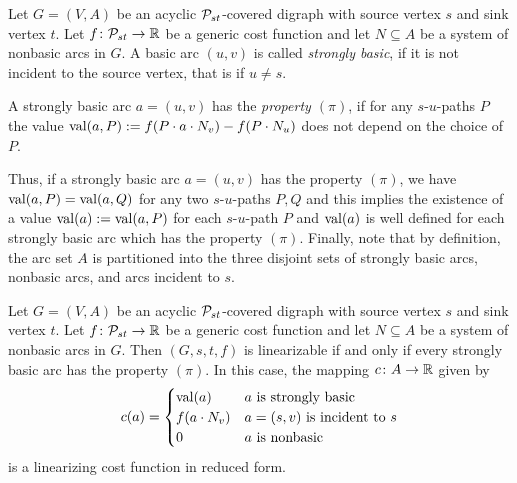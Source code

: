 \begin{definition}\label{stronglybasic:def}
    Let $G = (V, A)$ be an acyclic $\mathcal{P}_{st}$-covered digraph with source vertex $s$ and sink vertex $t$.  Let $f \colon  \mathcal{P}_{st} \rightarrow \mathbb{R}$ be a generic cost function and let $N \subseteq A$ be a system of nonbasic arcs in $G$. A basic arc $(u, v)$ is called \emph{strongly basic}, if it is not incident to the source vertex, that is if $u \neq s$.
    
  \noindent  A strongly basic arc $a = (u,v)$ has the \emph{property $(\pi)$}, if for 
    any $s$-$u$-paths $P$ the value $ \operatorname{val}(a, P) :=  f(P \cdot a \cdot N_v) - f(P \cdot N_u)$ does not depend  on the choice of $P$. 
    \end{definition}
    
    Thus, if a strongly basic arc $a = (u,v)$ has the property $(\pi)$,   we have  $\operatorname{val}(a, P) = \operatorname{val}(a, Q)$ for any two  $s$-$u$-paths $P, Q$ and this implies the existence of a value   $\operatorname{val}(a) := \operatorname{val}(a, P)$ for each  $s$-$u$-path $P$ and $\operatorname{val}(a)$ is well defined for each strongly basic arc which has the property $(\pi)$.
    Finally, note that by definition, the arc set $A$ is partitioned into the three disjoint sets of strongly basic arcs, nonbasic arcs, and arcs incident to $s$. 



\begin{lemma}
\label{lemma:property-pi}
    Let $G = (V, A)$ be an acyclic $\mathcal{P}_{st}$-covered digraph with source vertex $s$ and sink vertex $t$. Let $f \colon \mathcal{P}_{st} \rightarrow \mathbb{R}$ be a generic cost function and let $N \subseteq A$ be a system of nonbasic arcs in $G$. Then $(G, s,t,f)$ is linearizable if and only if every strongly basic arc has the property $(\pi)$. In this case, the mapping   $c \colon  A \rightarrow \mathbb{R}$ given by
    \[
    c(a) = \begin{cases}
    \operatorname{val}(a) & a \text{ is strongly basic }\\
    f(a \cdot N_v) & a = (s,v) \text{ is incident to }s\\
    0 & a \text{ is nonbasic}
    \end{cases}
    \]
    is a  linearizing cost function  in reduced form.
\end{lemma}


